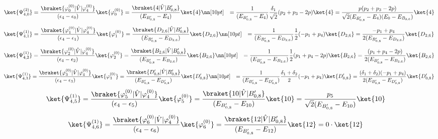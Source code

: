 \begin{align}
    \ket{\Psi_{4,0}^{(2)}}
     &=\frac{\braket{\varphi_{0
     }^{(0)}|\hat{V}|\varphi_{4}^{(0)}}}{(\epsilon_{4}-\epsilon_{0})}\ket{\varphi_{0}^{(0)}}
     =\frac{\braket{4|\hat{V}|B_{0,8}^{\prime}}}{(E_{B_{0,8}^{\prime}}-E_4)}\ket{4}
     \nn[10pt]
     &=
     \frac{1}{(E_{B_{0,8}^{\prime}}-E_4)}
     \frac{\delta_1}{\sqrt{2}}(p_2+p_3-2p)
     \ket{4}
     =
     \frac{p(p_2+p_3-2p)}{\sqrt{2}(E_{B_{0,8}^{\prime}}-E_4)(E_0-E_{B_{2,6}})}
     \ket{4}
\end{align}
\begin{align}
     \ket{\Psi_{4,1}^{(1)}}
     &=
     \frac{\braket{\varphi_{1
     }^{(0)}|\hat{V}|\varphi_{4}^{(0)}}}{(\epsilon_{4}-\epsilon_{1})}\ket{\varphi_{1}^{(0)}}
      =\frac{\braket{D_{2,6}|\hat{V}|B_{0,8}^{\prime}}}{(E_{B_{0,8}^{\prime}}-E_{D_{2,6}})}\ket{D_{2,6}}\nn[10pt]
      &=\frac{1}{(E_{B_{0,8}^{\prime}}-E_{D_{2,6}})}
      \frac{1}{2}(-p_1+p_4)
      \ket{D_{2,6}}
      =\frac{-p_1+p_4}{2(E_{B_{0,8}^{\prime}}-E_{D_{2,6}})}
      \ket{D_{2,6}}
\end{align}
\begin{align}
     \ket{\Psi_{4,2}^{(1)}}
     &=
     \frac{\braket{\varphi_{2
     }^{(0)}|\hat{V}|\varphi_{4}^{(0)}}}{(\epsilon_{4}-\epsilon_{2})}\ket{\varphi_{2}^{(0)}}
      =\frac{\braket{B_{2,6}|\hat{V}|B_{0,8}^{\prime}}}{(E_{B_{0,8}^{\prime}}-E_{B_{2,6}})}\ket{B_{2,6}}\nn[10pt]
      &=\frac{1}{(E_{B_{0,8}^{\prime}}-E_{B_{2,6}})}
      \frac{1}{2}(p_1+p_4-2p)
      \ket{B_{2,6}}
      =\frac{(p_1+p_4-2p)}{2(E_{B_{0,8}^{\prime}}-E_{B_{2,6}})}
      \ket{B_{2,6}}
\end{align}
\begin{align}
     \ket{\Psi_{4,3}^{(1)}}
     &=
     \frac{\braket{\varphi_{3
     }^{(0)}|\hat{V}|\varphi_{4}^{(0)}}}{(\epsilon_{4}-\epsilon_{3})}\ket{\varphi_{3}^{(0)}}
      =\frac{\braket{D_{0,8}^{\prime}|\hat{V}|B_{0,8}^{\prime}}}{(E_{B_{0,8}^{\prime}}-E_{D_{0,8}^{\prime}})}\ket{D_{0,8}^{\prime}}\nn[10pt]
      &=\frac{1}{(E_{B_{0,8}^{\prime}}-E_{D_{0,8}^{\prime}})}
      \frac{\delta_1+\delta_2}{2}(-p_1+p_4)\ket{D_{0,8}^{\prime}}
      =\frac{(\delta_1+\delta_2)(-p_1+p_4)}
      {2(E_{B_{0,8}^{\prime}}-E_{D_{0,8}^{\prime}})}
      \ket{D_{0,8}^{\prime}}
\end{align}
\begin{align}
     \ket{\Psi_{4,5}^{(1)}}
     &=
     \frac{\braket{\varphi_{5
     }^{(0)}|\hat{V}|\varphi_{4}^{(0)}}}{(\epsilon_{4}-\epsilon_{5})}\ket{\varphi_{5}^{(0)}}
      =\frac{\braket{10|\hat{V}|B_{0,8}^{\prime}}}{(E_{B_{0,8}^{\prime}}-E_{10})}\ket{10}
      =\frac{p_5}{\sqrt{2}(E_{B_{0,8}^{\prime}}-E_{10})}\ket{10}
\end{align}
\begin{align}
     \ket{\Psi_{4,6}^{(1)}}
     &=
     \frac{\braket{\varphi_{6
     }^{(0)}|\hat{V}|\varphi_{4}^{(0)}}}{(\epsilon_{4}-\epsilon_{6})}\ket{\varphi_{6}^{(0)}}
      =\frac{\braket{12|\hat{V}|B_{0,8}^{\prime}}}{(E_{B_{0,8}^{\prime}}-E_{12})}\ket{12}=0\cdot\ket{12}
\end{align}

